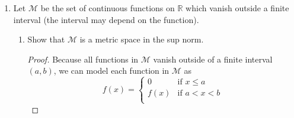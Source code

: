 \documentclass{article}
\begin{document}
\begin{enumerate}
\begin{enumerate}
\begin{proof}
                              is complete. Therefore, $(\mathcal{M}, \rho)$ is complete only if
                              $(\mathcal{M}, \sigma)$ is complete.
                        \end{proof}
                  \item Suppose that $\rho$ and $\sigma$ are equivalent metrics
                        on $\mathcal{M}$. Show by example that it is possible
                        that $(\mathcal{M}, \rho)$ is complete but
                        $(\mathcal{M}, \sigma)$ is not complete.
                        \begin{proof}
                              Let $\mathcal{M}=\mathbb{R}^2$, and
                              \begin{align*}
                                    \rho(x,y)   & \equiv \lvert x-y\rvert                             \\
                                    \sigma(x,y) & \equiv \frac{\lvert x-y\rvert}{1+\lvert x-y\rvert}. \\
                              \end{align*}
                        \end{proof}
            \end{enumerate}
            \setcounter{enumi}{11}
      \item Let $\mathcal{M}$ be the set of continuous functions on $\mathbb{R}$
            which vanish outside a finite interval (the interval may depend on
            the function).
            \begin{enumerate}
                  \item Show that $\mathcal{M}$ is a metric space in the sup
                        norm.
                        \begin{proof}
                              Because all functions in $\mathcal{M}$ vanish
                              outside of a finite interval $(a,b)$, we can model
                              each function in $\mathcal{M}$ as
                              \[
                                    f(x) = \begin{cases}
                                          0    & \textrm{if } x\leq a \\
                                          f(x) & \textrm{if } a<x<b   \\

\end{cases}\]
\end{proof}
\end{enumerate}
\end{enumerate}
\end{document}
